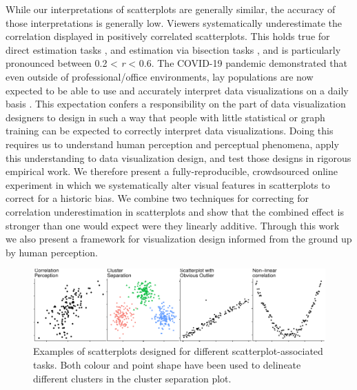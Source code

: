 \documentclass[manuscript, review, anonymous, screen]{acmart}
\begin{document}
While our interpretations of scatterplots are generally similar, the
accuracy of those interpretations is generally low. Viewers
systematically underestimate the correlation displayed in positively
correlated scatterplots. This holds true for direct estimation tasks
\citep{strahan_1978, bobko_1979, cleveland_1982, lane_1985, lauer_1989, collyer_1990, meyer_1992},
and estimation via bisection tasks \citep{rensink_2017}, and is
particularly pronounced between 0.2 \textless{} \emph{r} \textless{}
0.6. The COVID-19 pandemic demonstrated that even outside of
professional/office environments, lay populations are now expected to be
able to use and accurately interpret data visualizations on a daily
basis \citep{bbc_2022}. This expectation confers a responsibility on the
part of data visualization designers to design in such a way that people
with little statistical or graph training can be expected to correctly
interpret data visualizations. Doing this requires us to understand
human perception and perceptual phenomena, apply this understanding to
data visualization design, and test those designs in rigorous empirical
work. We therefore present a fully-reproducible, crowdsourced online
experiment in which we systematically alter visual features in
scatterplots to correct for a historic bias. We combine two techniques
for correcting for correlation underestimation in scatterplots and show
that the combined effect is stronger than one would expect were they
linearly additive. Through this work we also present a framework for
visualization design informed from the ground up by human perception.

\begin{figure}

{\centering \includegraphics[width=1\textwidth,height=\textheight]{size_and_contrast_new_files/figure-pdf/fig-tasks-1.pdf}

}

\caption{\label{fig-tasks}Examples of scatterplots designed for
different scatterplot-associated tasks. Both colour and point shape have
been used to delineate different clusters in the cluster separation
plot.}

\end{figure}
\end{document}

